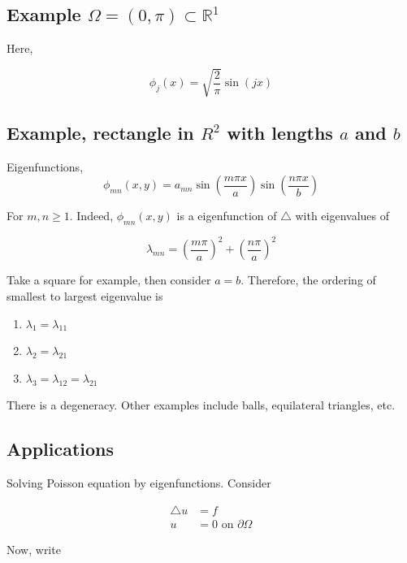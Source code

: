 \documentclass{article}
\newtheorem{one minute paper}[theorem]{One Minute Paper}
\begin{document}
\subsection*{Example $\Omega = (0, \pi) \subset \mathbb{R}^1$}

Here, 

\begin{equation}
    \phi_j(x) = \sqrt{\frac{2}{\pi}}\sin(jx)
\end{equation}

\subsection*{Example, rectangle in $R^2$ with lengths $a$ and $b$}

Eigenfunctions, $$\phi_{mn}(x,y) = a_{mn}\sin\left( \frac{m\pi x}{a} \right)\sin\left( \frac{n\pi x}{b} \right)$$

For $m,n \geq 1$. Indeed, $\phi_{mn}(x,y)$ is a eigenfunction of $\triangle$ with eigenvalues of 

\begin{equation}
    \lambda_{mn} = \left( \frac{m\pi}{a} \right)^2 + \left( \frac{n\pi}{a} \right)^2
\end{equation}

Take a square for example, then consider $a=b$. Therefore, the ordering of smallest to largest eigenvalue is 

\begin{enumerate}
    \item $\lambda_1 = \lambda_{11}$
    \item $\lambda_2 = \lambda_{21}$
    \item $\lambda_3 = \lambda_{12} = \lambda_{21}$
\end{enumerate}

There is a degeneracy. Other examples include balls, equilateral triangles, etc.

\subsection*{Applications}

Solving Poisson equation by eigenfunctions. Consider 

\begin{align*}
    \triangle u &= f \\
    u&= 0 \text{ on $\partial \Omega$}
\end{align*}

Now, write 
\end{document}
